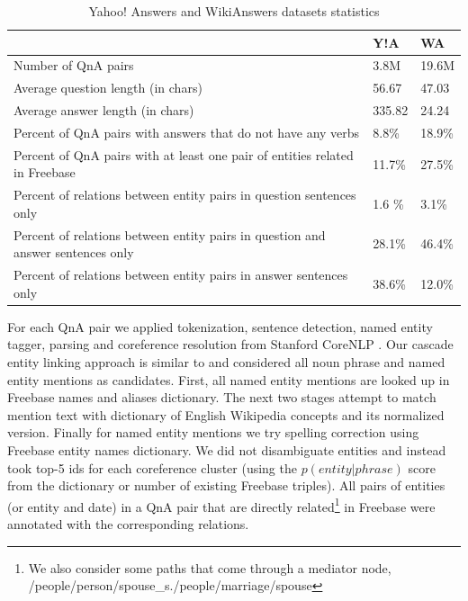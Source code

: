 \begin{table}[ht]
\centering
\begin{tabular}{|p{12.5cm}||p{1.2cm}|p{1.2cm}|} \hline
& Y!A & WA\\
\hline
Number of QnA pairs & 3.8M & 19.6M \\
Average question length (in chars) & 56.67 & 47.03 \\
Average answer length (in chars) & 335.82 & 24.24 \\
Percent of QnA pairs with answers that do not have any verbs & 8.8\% & 18.9\% \\
Percent of QnA pairs with at least one pair of entities related in Freebase & 11.7\% & 27.5\% \\
Percent of relations between entity pairs in question sentences only & 1.6 \% & 3.1\% \\
Percent of relations between entity pairs in question and answer sentences only & 28.1\% & 46.4\% \\
Percent of relations between entity pairs in answer sentences only & 38.6\%& 12.0\%\\
\hline
\end{tabular}
\caption{Yahoo! Answers and WikiAnswers datasets statistics}
\label{table:qna_relextract:cqastats}
\end{table}

For each QnA pair we applied tokenization, sentence detection, named entity tagger, parsing and coreference resolution from Stanford CoreNLP \cite{manning-EtAl:2014:P14-5}.
Our cascade entity linking approach is similar to \cite{chang2011stanford} and considered all noun phrase and named entity mentions as candidates.
First, all named entity mentions are looked up in Freebase names and aliases dictionary.
The next two stages attempt to match mention text with dictionary of English Wikipedia concepts \cite{spitkovsky2012cross} and its normalized version.
Finally for named entity mentions we try spelling correction using Freebase entity names dictionary.
We did not disambiguate entities and instead took top-5 ids for each coreference cluster (using the $p(entity|phrase)$ score from the dictionary or number of existing Freebase triples).
All pairs of entities (or entity and date) in a QnA pair that are directly related\footnote{We also consider some paths that come through a mediator node, \eg  /people/person/spouse\_s./people/marriage/spouse} in Freebase were annotated with the corresponding relations.

